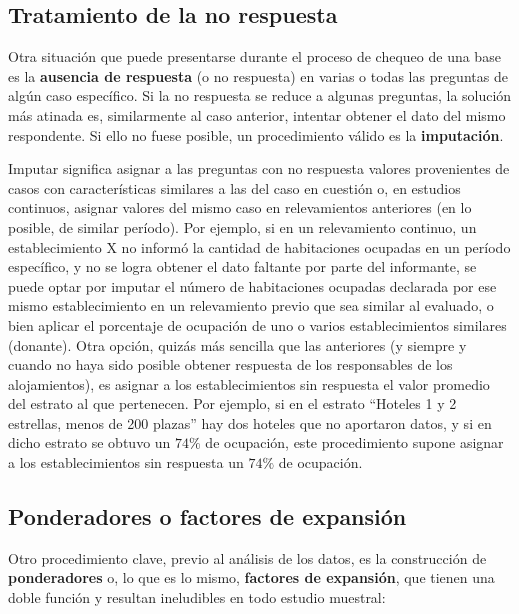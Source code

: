 \documentclass[
]{book}
\begin{document}
\hypertarget{tratamiento-de-la-no-respuesta}{%
\subsection{Tratamiento de la no respuesta}\label{tratamiento-de-la-no-respuesta}}

Otra situación que puede presentarse durante el proceso de chequeo de una base es la \textbf{ausencia de respuesta} (o no respuesta) en varias o todas las preguntas de algún caso específico. Si la no respuesta se reduce a algunas preguntas, la solución más atinada es, similarmente al caso anterior, intentar obtener el dato del mismo respondente. Si ello no fuese posible, un procedimiento válido es la \textbf{imputación}.

Imputar significa asignar a las preguntas con no respuesta valores provenientes de casos con características similares a las del caso en cuestión o, en estudios continuos, asignar valores del mismo caso en relevamientos anteriores (en lo posible, de similar período). Por ejemplo, si en un relevamiento continuo, un establecimiento X no informó la cantidad de habitaciones ocupadas en un período específico, y no se logra obtener el dato faltante por parte del informante, se puede optar por imputar el número de habitaciones ocupadas declarada por ese mismo establecimiento en un relevamiento previo que sea similar al evaluado, o bien aplicar el porcentaje de ocupación de uno o varios establecimientos similares (donante). Otra opción, quizás más sencilla que las anteriores (y siempre y cuando no haya sido posible obtener respuesta de los responsables de los alojamientos), es asignar a los establecimientos sin respuesta el valor promedio del estrato al que pertenecen. Por ejemplo, si en el estrato ``Hoteles 1 y 2 estrellas, menos de 200 plazas'' hay dos hoteles que no aportaron datos, y si en dicho estrato se obtuvo un \(74\%\) de ocupación, este procedimiento supone asignar a los establecimientos sin respuesta un \(74\%\) de ocupación.

\hypertarget{ponderadores-o-factores-de-expansiuxf3n}{%
\subsection{Ponderadores o factores de expansión}\label{ponderadores-o-factores-de-expansiuxf3n}}

Otro procedimiento clave, previo al análisis de los datos, es la construcción de \textbf{ponderadores} o, lo que es lo mismo, \textbf{factores de expansión}, que tienen una doble función y resultan ineludibles en todo estudio muestral:
\end{document}
